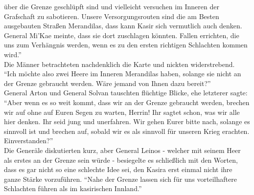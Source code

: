 über die Grenze geschlüpft sind und vielleicht versuchen im Inneren der Grafschaft zu sabotieren. 
Unsere Versorgungsrouten sind die am Besten ausgebauten Straßen Merandilas, dass kann Kasir sich 
vermutlich auch denken. General Mi'Kae meinte, dass sie dort zuschlagen könnten. Fallen errichten, 
die uns zum Verhängnis werden, wenn es zu den ersten richtigen Schlachten kommen wird.''\\
Die Männer betrachteten nachdenklich die Karte und nickten widerstrebend.\\
``Ich möchte also zwei Heere im Inneren Merandilas haben, solange sie nicht an der Grenze gebraucht 
werden. Wäre jemand von Ihnen dazu bereit?''\\
General Arton und General Solvan tauschten flüchtige Blicke, ehe letzterer sagte: ``Aber wenn es so 
weit kommt, dass wir an der Grenze gebraucht werden, brechen wir auf ohne auf Euren Segen zu 
warten, Herrin! Ihr sagtet schon, was wir alle hier denken. Ihr seid jung und unerfahren. Wir gehen 
Eurer bitte nach, solange es sinnvoll ist und brechen auf, sobald wir es als sinnvoll für unseren 
Krieg erachten. Einverstanden?''\\
Die Generäle diskutierten kurz, aber General Leinos - welcher mit seinem Heer als erstes an der 
Grenze sein würde - besiegelte es schließlich mit den Worten, dass es gar nicht so eine schlechte 
Idee sei, den Kasira erst einmal nicht ihre ganze Stärke vorzuführen. ``Nahe der Grenze lassen 
sich für uns vorteilhaftere Schlachten führen als im kasirischen Innland.''\\


